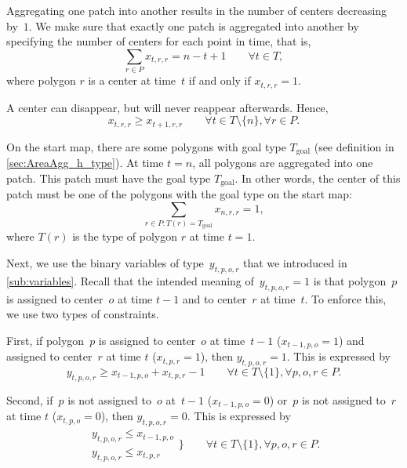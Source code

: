 Aggregating one patch into another results in 
the number of centers decreasing by~$1$.
We make sure that exactly one patch 
is aggregated into another by 
specifying the number of centers
for each point in time, that is,
\begin{equation}
\label{eq:CstrCountCenter}
\sum_{r\in P} x_{t,r,r}=n-t+1 \qquad
\forall t \in {T},
\end{equation}
where polygon $r$ is a center at time~$t$ if and only if 
$x_{t,r,r}=1$.

A center can disappear, but will never reappear afterwards.
Hence,
\begin{equation}
\label{eq:CstrNoReappear}
x_{t,r,r} \geq x_{t+1,r,r} \qquad 
\forall t \in {T}\setminus \{n\},
\forall r \in P.
\end{equation}


On the start map, 
there are some polygons with  goal type $T_\mathrm{goal}$
(see definition in \sect\ref{sec:AreaAgg_h_type}).
At time $t=n$, all polygons are aggregated into one patch.
This patch must have the goal type $T_\mathrm{goal}$.
In other words, the center of this patch must be one of the 
polygons with the 
goal type on the start map:
\begin{equation}
\label{eq:CstrType}
\sum_{r\in P \colon T(r)=T_\mathrm{goal}} x_{n,r,r}=1,
\end{equation}
where $T(r)$ is the type of polygon $r$ at time $t=1$.

Next, we use the binary variables of type~$y_{t,p,o,r}$ that we
introduced in \sect\ref{sub:variables}.  Recall that the 
intended 
meaning of~$y_{t,p,o,r}=1$ is that polygon~$p$ is assigned to
center~$o$ at time $t-1$ and to center~$r$ at time~$t$.
To enforce this, we use two types of constraints.

First, if polygon~$p$ is assigned 
to center~$o$ at time~$t-1$ ($x_{t-1,p,o}=1$)
and assigned to center~$r$ at time $t$
($x_{t,p,r}=1$), then $y_{t,p,o,r}=1$.  This is expressed by
\begin{equation}
\label{eq:CstrY1}
y_{t,p,o,r}\geq x_{t-1,p,o}+x_{t,p,r}-1 \qquad
\forall t \in {T} \setminus \{1\}, 
\forall p, o, r \in P.
\end{equation}

Second, if~$p$ is not assigned to~$o$ at~$t-1$ ($x_{t-1,p,o}=0$)
or~$p$ is not assigned to~$r$ at time $t$ ($x_{t,p,o}=0$),
then $y_{t,p,o,r}=0$.
This is expressed by
\begin{equation}
\label{eq:CstrY2}
\begin{array}{l}
y_{t,p,o,r} \le x_{t-1,p,o} \\
y_{t,p,o,r} \le x_{t,p,r}
\end{array} 
\bigg\} \qquad 
\forall t\in T\setminus \{1\}, 
\forall	p,o,r \in P.	
\end{equation}

